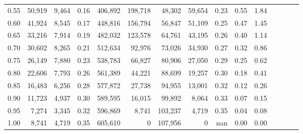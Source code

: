 \begin{tabular}{rrrcrrrrrrrrrrr}
0.55 &  50,919 &  9,464 &                                       0.16 &  406,892 &  198,718 &   48,302 &   59,654 &  0.23 &  0.55 &                         1.84 \\
0.60 &  41,924 &  8,545 &                                       0.17 &  448,816 &  156,794 &   56,847 &   51,109 &  0.25 &  0.47 &                         1.45 \\
0.65 &  33,216 &  7,914 &                                       0.19 &  482,032 &  123,578 &   64,761 &   43,195 &  0.26 &  0.40 &                         1.14 \\
0.70 &  30,602 &  8,265 &                                       0.21 &  512,634 &   92,976 &   73,026 &   34,930 &  0.27 &  0.32 &                         0.86 \\
0.75 &  26,149 &  7,880 &                                       0.23 &  538,783 &   66,827 &   80,906 &   27,050 &  0.29 &  0.25 &                         0.62 \\
0.80 &  22,606 &  7,793 &                                       0.26 &  561,389 &   44,221 &   88,699 &   19,257 &  0.30 &  0.18 &                         0.41 \\
0.85 &  16,483 &  6,256 &                                       0.28 &  577,872 &   27,738 &   94,955 &   13,001 &  0.32 &  0.12 &                         0.26 \\
0.90 &  11,723 &  4,937 &                                       0.30 &  589,595 &   16,015 &   99,892 &    8,064 &  0.33 &  0.07 &                         0.15 \\
0.95 &   7,274 &  3,345 &                                       0.32 &  596,869 &    8,741 &  103,237 &    4,719 &  0.35 &  0.04 &                         0.08 \\
1.00 &   8,741 &  4,719 &                                       0.35 &  605,610 &        0 &  107,956 &        0 &   nan &  0.00 &                         0.00 \\
\bottomrule
\end{tabular}
